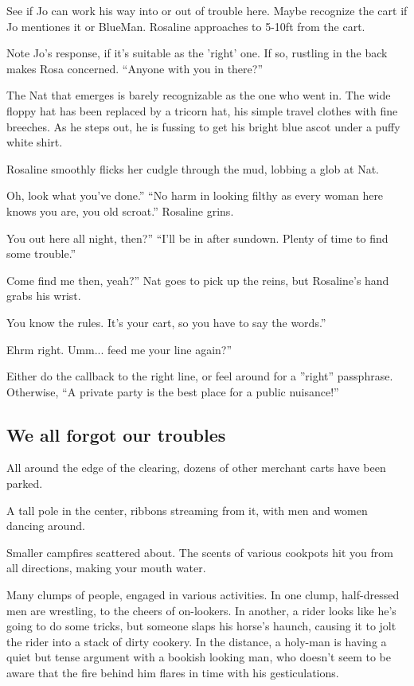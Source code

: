 \begin{multicols}{2}
  See if Jo can work his way into or out of trouble here.
  Maybe recognize the cart if Jo mentiones it or BlueMan.
  Rosaline approaches to 5-10ft from the cart.
  
  Note Jo's response, if it's suitable as the 'right' one.
  If so, rustling in the back makes Rosa concerned.
  ``Anyone with you in there?''
  
  \begin{aloud}
    The Nat that emerges is barely recognizable as the one who went in.
    The wide floppy hat has been replaced by a tricorn hat, his simple travel clothes with fine breeches.
    As he steps out, he is fussing to get his bright blue ascot under a puffy white shirt.
  \end{aloud}

  Rosaline smoothly flicks her cudgle through the mud, lobbing a glob at Nat.
  
  Oh, look what you've done.''  ``No harm in looking filthy as every woman here knows you are, you old scroat.''  Rosaline grins.
  
  You out here all night, then?''  ``I'll be in after sundown.  Plenty of time to find some trouble.''
  
  Come find me then, yeah?''  Nat goes to pick up the reins, but Rosaline's hand grabs his wrist.
  
  You know the rules.  It's your cart, so you have to say the words.''
  
  Ehrm right.  Umm... feed me your line again?''
  
  Either do the callback to the right line, or feel around for a ''right'' passphrase.  Otherwise, ``A private party is the best place for a public nuisance!''
\vfill\null\columnbreak
\subsection{We all forgot our troubles}
  \begin{aloud}
  All around the edge of the clearing, dozens of other merchant carts have been parked.

  A tall pole in the center, ribbons streaming from it, with men and women dancing around.

  Smaller campfires scattered about.
  The scents of various cookpots hit you from all directions, making your mouth water.

  Many clumps of people, engaged in various activities.
  In one clump, half-dressed men are wrestling, to the cheers of on-lookers.
  In another, a rider looks like he's going to do some tricks, but someone slaps his horse's haunch, causing it to jolt the rider into a stack of dirty cookery.
  In the distance, a holy-man is having a quiet but tense argument with a bookish looking man, who doesn't seem to be aware that the fire behind him flares in time with his gesticulations.


\end{aloud}
\end{multicols}
